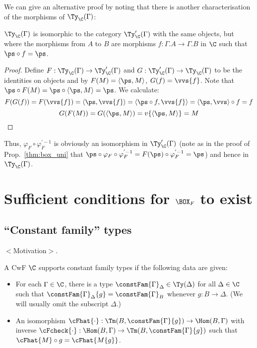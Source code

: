 \documentclass{article}
\begin{document}
We can give an alternative proof by noting that there is another
characterisation of the morphisms of $\Ty_{\C}(\Gamma)$:

\begin{proposition}
  $\Ty_{\C}(\Gamma)$ is isomorphic to the category $\Ty'_{\C}(\Gamma)$
  with the same objects, but where the morphisms from $A$ to $B$ are morphisms $f : \Gamma . A \to \Gamma . B$ in $\C$ such that $\ps \circ f = \ps$.
\end{proposition}
\begin{proof}
  Define $F : \Ty_{\C}(\Gamma) \to \Ty'_{\C}(\Gamma)$ and $G :
  \Ty'_{\C}(\Gamma) \to \Ty_{\C}(\Gamma)$ to be the identities on
  objects and by $F(M) = \langle \ps, M\rangle$, $G(f) =
  \vvs\{f\}$. Note that $\ps \circ F(M) = \ps \circ \langle \ps , M
  \rangle = \ps$. We calculate:
\[    F(G(f)) = F(\vvs\{f\}) = \langle \ps, \vvs\{f\}\rangle = \langle \ps \circ f, \vvs\{f\}\rangle = \langle \ps , \vvs\rangle \circ f = f \]\[
    G(F(M)) = G(\langle \ps, M\rangle) = v\{\langle \ps , M\rangle\} = M
\]
\end{proof}

Thus, $\varphi_F \circ \varphi_F^{'-1}$ is obviously an isomorphism in
$\Ty'_{\C}(\Gamma)$ (note as in the proof of Prop.~\ref{thm:box_uni} that $\ps \circ \varphi_F \circ
\varphi_F^{'-1} = F(\ps) \circ \varphi_F^{'-1} = \ps$) and hence in
$\Ty_{\C}(\Gamma)$.

\section{Sufficient conditions for $\BOX_F$ to exist}

\subsection{``Constant family'' types}

$<$Motivation$>$.

\begin{definition}
  A CwF $\C$ supports constant family types if the following data are given:
  \begin{itemize}
  \item For each $\Gamma \in \C$, there is a type $\constFam{\Gamma}_{\Delta} \in
    \Ty(\Delta)$ for all $\Delta \in \C$ such that
    $
    \constFam{\Gamma}_{\Delta}\{g\} = \constFam{\Gamma}_{B}
    $
    whenever $g : B \to \Delta$. (We will usually omit the subscript $\Delta$.)
  \item An isomorphism $\cFhat{\cdot} : \Tm(B, \constFam{\Gamma}\{g\})
    \to \Hom(B, \Gamma)$ with inverse $\cFcheck{\cdot} : \Hom(B,
    \Gamma) \to \Tm(B, \constFam{\Gamma}\{g\})$ such that $\cFhat{M}
    \circ g = \cFhat{M\{g\}}$.
  \end{itemize}
\end{definition}
\end{document}
